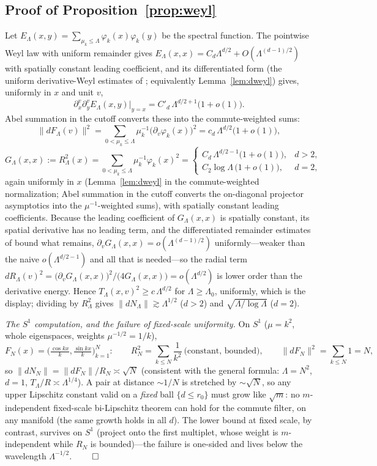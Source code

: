 \documentclass[11pt]{article}
\theoremstyle{remark}
\begin{document}
\subsection*{Proof of Proposition~\ref{prop:weyl}}
Let $E_\Lambda(x,y)=\sum_{\mu_k\le\Lambda}\varphi_k(x)\varphi_k(y)$ be the
spectral function. The pointwise Weyl law with uniform remainder
\cite{hormander1968} gives $E_\Lambda(x,x)=C_d\Lambda^{d/2}+O(\Lambda^{(d-1)/2})$
with spatially constant leading coefficient, and its differentiated form
(the uniform derivative-Weyl estimates of \cite{binxu2004}; equivalently
Lemma~\ref{lem:dweyl}) gives, uniformly in $x$ and unit $v$,
\[
\partial^v_x\partial^v_y E_\Lambda(x,y)\big|_{y=x}
=C'_d\,\Lambda^{d/2+1}\big(1+o(1)\big).
\]
Abel summation in the cutoff converts these into the commute-weighted sums:
\[
\lVert dF_\Lambda(v)\rVert^2
=\sum_{0<\mu_k\le\Lambda}\mu_k^{-1}\big(\partial_v\varphi_k(x)\big)^2
=c_d\,\Lambda^{d/2}\big(1+o(1)\big),
\]
\[
G_\Lambda(x,x):=R_\Lambda^2(x)
=\sum_{0<\mu_k\le\Lambda}\mu_k^{-1}\varphi_k(x)^2
=\begin{cases}
C_d\,\Lambda^{d/2-1}\big(1+o(1)\big), & d>2,\\[2pt]
C_2\log\Lambda\,\big(1+o(1)\big), & d=2,
\end{cases}
\]
again uniformly in $x$ (Lemma~\ref{lem:dweyl} in the commute-weighted
normalization; Abel summation in the cutoff converts the on-diagonal projector
asymptotics into the $\mu^{-1}$-weighted sums), with spatially constant leading
coefficients. Because the leading coefficient of $G_\Lambda(x,x)$ is spatially
constant, its spatial derivative has no leading term, and the differentiated
remainder estimates of \cite{binxu2004} bound what remains,
$\partial_vG_\Lambda(x,x)=o(\Lambda^{(d-1)/2})$ uniformly---weaker than the naive
$o(\Lambda^{d/2-1})$ and all that is needed---so the radial term
$dR_\Lambda(v)^2=\big(\partial_vG_\Lambda(x,x)\big)^2/\big(4G_\Lambda(x,x)\big)
=o(\Lambda^{d/2})$ is lower order than the derivative energy. Hence
$T_\Lambda(x,v)^2\ge c\,\Lambda^{d/2}$ for $\Lambda\ge\Lambda_0$, uniformly,
which is the display; dividing by $R_\Lambda^2$ gives
$\lVert dN_\Lambda\rVert\gtrsim\Lambda^{1/2}$ ($d>2$) and
$\sqrt{\Lambda/\log\Lambda}$ ($d=2$).

\emph{The $S^1$ computation, and the failure of fixed-scale uniformity.} On
$S^1$ ($\mu=k^2$, whole eigenspaces, weights $\mu^{-1/2}=1/k$),
\[
F_N(x)=\Big(\tfrac{\cos kx}{k},\tfrac{\sin kx}{k}\Big)_{k=1}^{N}:\qquad
R_N^2=\sum_{k\le N}\frac1{k^2}\ \text{(constant, bounded)},\qquad
\lVert dF_N\rVert^2=\sum_{k\le N}1=N,
\]
so $\lVert dN_N\rVert=\lVert dF_N\rVert/R_N\asymp\sqrt N$ (consistent with the
general formula: $\Lambda=N^2$, $d=1$, $T_\Lambda/R\asymp\Lambda^{1/4}$). A
pair at distance $\sim1/N$ is stretched by $\sim\sqrt N$, so any upper
Lipschitz constant valid on a \emph{fixed} ball $\{d\le r_0\}$ must grow like
$\sqrt m$: no $m$-independent fixed-scale bi-Lipschitz theorem can hold for
the commute filter, on any manifold (the same growth holds in all $d$). The
lower bound at fixed scale, by contrast, survives on $S^1$ (project onto the
first multiplet, whose weight is $m$-independent while $R_N$ is bounded)---the
failure is one-sided and lives below the wavelength $\Lambda^{-1/2}$.
\hfill$\qed$
\end{document}
